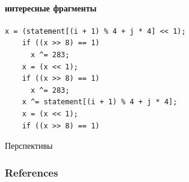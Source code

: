 \documentclass{beamer}              %
\begin{document}
\begin{frame}[fragile]
\framesubtitle{интересные фрагменты}
\begin{lstlisting}[frame=single]
	x = (statement[(i + 1) % 4 + j * 4] << 1);
	if ((x >> 8) == 1)
	  x ^= 283;
	x = (x << 1);
	if ((x >> 8) == 1)
	  x ^= 283;
	x ^= statement[(i + 1) % 4 + j * 4];
	x = (x << 1);
	if ((x >> 8) == 1)
\end{lstlisting}
\label{clone_listing}
\end{frame}

\begin{frame}{Перспективы}
  
\end{frame}


\begin{frame}[allowframebreaks]
        \frametitle{References}
        
        
\end{frame}
\end{document}
